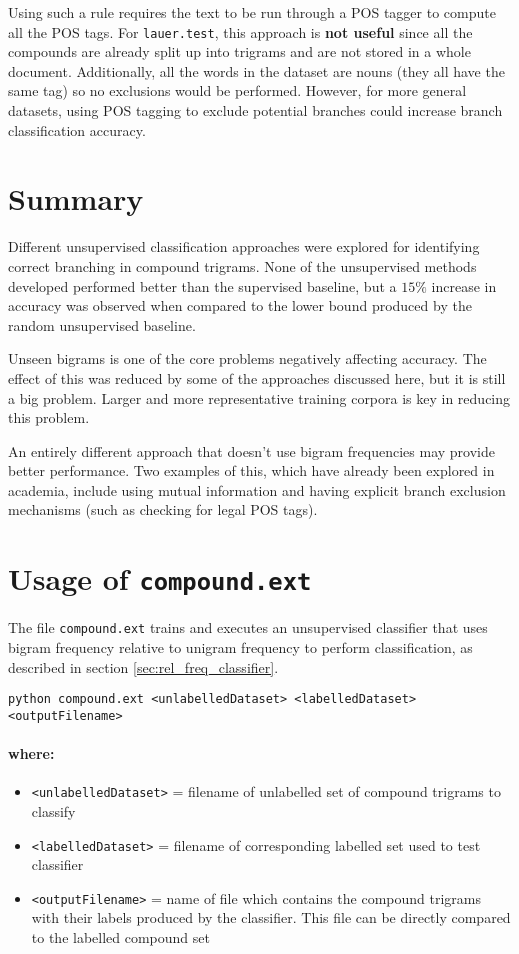 \documentclass{article}
\begin{document}
Using such a rule requires the text to be run through a POS tagger to compute all the POS tags. For \texttt{lauer.test}, this approach is \textbf{not useful} since all the compounds are already split up into trigrams and are not stored in a whole document. Additionally, all the words in the dataset are nouns (they all have the same tag) so no exclusions would be performed. However, for more general datasets, using POS tagging to exclude potential branches could increase branch classification accuracy.

\section{Summary}

Different unsupervised classification approaches were explored for identifying correct branching in compound trigrams. None of the unsupervised methods developed performed better than the supervised baseline, but a $15\%$ increase in accuracy was observed when compared to the lower bound produced by the random unsupervised baseline.

Unseen bigrams is one of the core problems negatively affecting accuracy. The effect of this was reduced by some of the approaches discussed here, but it is still a big problem. Larger and more representative training corpora is key in reducing this problem.

An entirely different approach that doesn't use bigram frequencies may provide better performance. Two examples of this, which have already been explored in academia, include using mutual information and having explicit branch exclusion mechanisms (such as checking for legal POS tags).

\section{Usage of \texttt{compound.ext}}

The file \texttt{compound.ext} trains and executes an unsupervised classifier that uses bigram frequency relative to unigram frequency to perform classification, as described in section \ref{sec:rel_freq_classifier}.

\texttt{python compound.ext <unlabelledDataset> <labelledDataset> <outputFilename>}
\paragraph{where:}
\begin{itemize}
	\item \texttt{<unlabelledDataset>} = filename of unlabelled set of compound trigrams to classify
	\item \texttt{<labelledDataset>} = filename of corresponding labelled set used to test classifier
	\item \texttt{<outputFilename>} = name of file which contains   the compound trigrams with their labels produced by the classifier. This file can be directly compared to the labelled compound set
\end{itemize}
\end{document}
